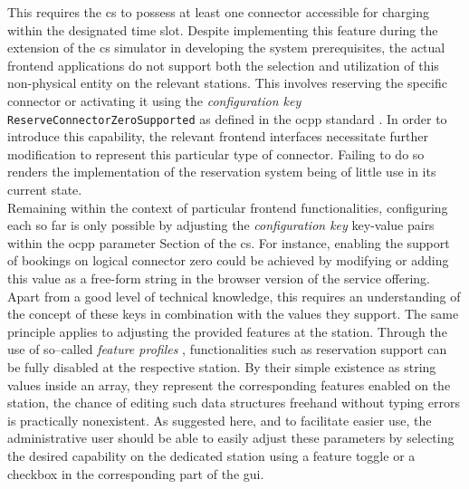 This requires the \acrshort{cs} to possess at least one connector accessible for charging within the designated time slot.
Despite implementing this feature during the extension of the \acrshort{cs} simulator in developing the system prerequisites, the actual frontend applications do not support both the selection and utilization of this non-physical entity on the relevant stations.
This involves reserving the specific connector or activating it using the \textit{configuration key} \texttt{ReserveConnectorZeroSupported} as defined in the \acrshort{ocpp} standard \cite{noauthor_ocpp_nodate}.
In order to introduce this capability, the relevant frontend interfaces necessitate further modification to represent this particular type of connector. Failing to do so renders the implementation of the reservation system being of little use in its current state. \\
Remaining within the context of particular frontend functionalities, configuring each  so far is only possible by adjusting the \textit{configuration key} key-value pairs within the \acrshort{ocpp} parameter Section of the \acrshort{cs}.
For instance, enabling the support of bookings on logical connector zero could be achieved by modifying or adding this value as a free-form string in the browser version of the service offering. 
Apart from a good level of technical knowledge, this requires an understanding of the concept of these keys in combination with the values they support. 
The same principle applies to adjusting the provided features at the station. Through the use of so--called \textit{feature profiles} \cite{noauthor_ocpp_nodate}, functionalities such as reservation support can be fully disabled at the respective station.
By their simple existence as string values inside an array, they represent the corresponding features enabled on the station, the chance of editing such data structures freehand without typing errors is practically nonexistent.
As suggested here, and to facilitate easier use, the administrative user should be able to easily adjust these parameters by selecting the desired capability on the dedicated station using a feature toggle or a checkbox in the corresponding part of the \acrshort{gui}. \\
